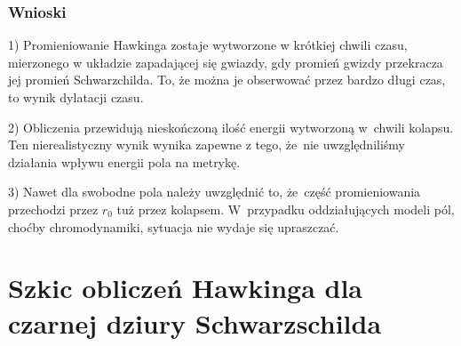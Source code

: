\documentclass[10pt,t]{beamer}
\begin{document}
\begin{frame}
  \frametitle{Wnioski}


  1) Promieniowanie Hawkinga zostaje wytworzone w krótkiej chwili
  czasu, mierzonego w układzie zapadającej się gwiazdy, gdy promień
  gwizdy przekracza jej promień Schwarzchilda. To, że można je
  obserwować przez bardzo długi czas, to wynik dylatacji czasu.

  2) Obliczenia przewidują nieskończoną ilość energii wytworzoną
  w~chwili kolapsu. Ten nierealistyczny wynik wynika zapewne z tego,
  że~nie uwzględniliśmy działania wpływu energii pola na metrykę.

  3) Nawet dla swobodne pola należy uwzględnić to, że~część
  promieniowania przechodzi przez $r_{ 0 }$ tuż przez kolapsem.
  W~przypadku oddziałujących modeli pól, choćby chromodynamiki, sytuacja
  nie wydaje się upraszczać.

\end{frame}









\appendix















\section{Szkic obliczeń Hawkinga dla czarnej dziury Schwarzschilda}
\end{document}
